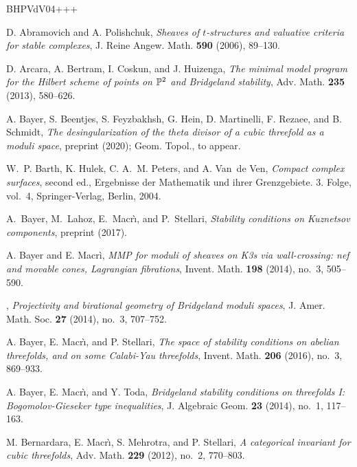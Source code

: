 \documentclass[11pt]{amsart}
\theoremstyle{definition}
\begin{document}
\newcommand{\etalchar}[1]{$^{#1}$}
\begin{thebibliography}{BHPVdV04+++}

D. Abramovich and A. Polishchuk, \emph{Sheaves of {$t$}-structures and
  valuative criteria for stable complexes}, J. Reine Angew. Math. \textbf{590}
  (2006), 89--130.

D. Arcara, A. Bertram, I. Coskun, and J. Huizenga, \emph{The
  minimal model program for the {H}ilbert scheme of points on {$\Bbb{P}^2$} and
  {B}ridgeland stability}, Adv. Math. \textbf{235} (2013), 580--626.

\bibitem[BBF{\etalchar{+}}20]{Bayer}
A. Bayer, S. Beentjes, S. Feyzbakhsh, G. Hein, D. Martinelli, F. Rezaee, and B. Schmidt, \emph{The
  desingularization of the theta divisor of a cubic threefold as a moduli
  space}, preprint  (2020); Geom. Topol., to appear.

W.~P. Barth, K. Hulek, C. A.~M. Peters, and A. Van~de Ven,
  \emph{Compact complex surfaces}, second ed., Ergebnisse der Mathematik und
  ihrer Grenzgebiete. 3. Folge, vol.~4, Springer-Verlag, Berlin, 2004.

A.~{Bayer}, M.~{Lahoz}, E.~{Macr{\`\i}}, and P.~{Stellari},
  \emph{Stability conditions on Kuznetsov components}, preprint
   (2017).

A. Bayer and E. Macr\`i, \emph{M{MP} for moduli of sheaves on {K}3s
  via wall-crossing: nef and movable cones, {L}agrangian fibrations}, Invent.
  Math. \textbf{198} (2014), no.~3, 505--590.

\bysame, \emph{Projectivity and birational geometry
  of {B}ridgeland moduli spaces}, J. Amer. Math. Soc. \textbf{27} (2014),
  no.~3, 707--752.

A. Bayer, E. Macr\`\i, and P. Stellari, \emph{The space of
  stability conditions on abelian threefolds, and on some {C}alabi-{Y}au
  threefolds}, Invent. Math. \textbf{206} (2016), no.~3, 869--933.
  
A. Bayer, E. Macr\`\i, and Y. Toda, \emph{Bridgeland stability
  conditions on threefolds {I}: {B}ogomolov-{G}ieseker type inequalities}, J.
  Algebraic Geom. \textbf{23} (2014), no.~1, 117--163.


M. Bernardara, E. Macr\`\i, S. Mehrotra, and P. Stellari,
  \emph{A categorical invariant for cubic threefolds}, Adv. Math. \textbf{229}
  (2012), no.~2, 770--803.


\end{thebibliography}
\end{document}
